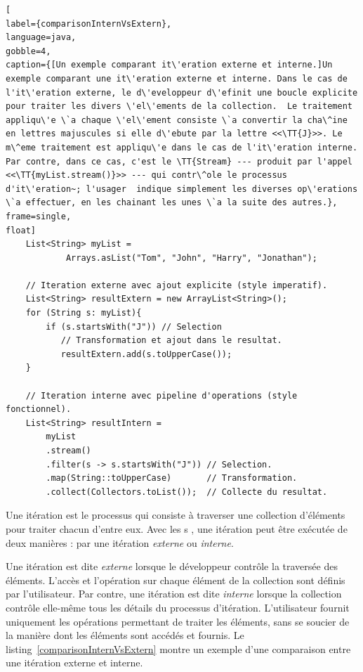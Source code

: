 \begin{lstlisting}[
label={comparisonInternVsExtern},
language=java,
gobble=4,
caption={[Un exemple comparant it\'eration externe et interne.]Un exemple comparant une it\'eration externe et interne. Dans le cas de l'it\'eration externe, le d\'eveloppeur d\'efinit une boucle explicite pour traiter les divers \'el\'ements de la collection.  Le traitement appliqu\'e \`a chaque \'el\'ement consiste \`a convertir la cha\^ine en lettres majuscules si elle d\'ebute par la lettre <<\TT{J}>>. Le m\^eme traitement est appliqu\'e dans le cas de l'it\'eration interne. Par contre, dans ce cas, c'est le \TT{Stream} --- produit par l'appel <<\TT{myList.stream()}>> --- qui contr\^ole le processus d'it\'eration~; l'usager  indique simplement les diverses op\'erations \`a effectuer, en les chainant les unes \`a la suite des autres.},
frame=single,
float]
    List<String> myList =
            Arrays.asList("Tom", "John", "Harry", "Jonathan");

    // Iteration externe avec ajout explicite (style imperatif).
    List<String> resultExtern = new ArrayList<String>();
    for (String s: myList){
        if (s.startsWith("J")) // Selection
           // Transformation et ajout dans le resultat.
           resultExtern.add(s.toUpperCase()); 
    }
        
    // Iteration interne avec pipeline d'operations (style fonctionnel).
    List<String> resultIntern = 
        myList
        .stream()
        .filter(s -> s.startsWith("J")) // Selection.
        .map(String::toUpperCase)       // Transformation.
        .collect(Collectors.toList());  // Collecte du resultat.
\end{lstlisting}


Une it\'eration est le processus qui consiste \`a traverser une collection d'\'el\'ements pour traiter chacun d'entre eux. Avec les s , une it\'eration peut \^etre ex\'ecut\'ee de deux mani\`eres : par une it\'eration \emph{externe} ou \emph{interne}. 

Une it\'eration est dite \emph{externe} lorsque le d\'eveloppeur contr\^ole la travers\'ee des \'el\'ements.  L'acc\`es et l'op\'eration sur chaque \'el\'ement de la collection sont d\'efinis par l'utilisateur. Par contre, une it\'eration est dite \emph{interne} lorsque la collection contr\^ole elle-m\^eme tous les d\'etails du processus d'it\'eration. L'utilisateur fournit uniquement les op\'erations permettant de traiter les \'el\'ements, sans se soucier de la mani\`ere dont les \'el\'ements sont acc\'ed\'es et fournis. Le listing~\ref{comparisonInternVsExtern} montre un exemple d’une comparaison entre une itération externe et interne. 

